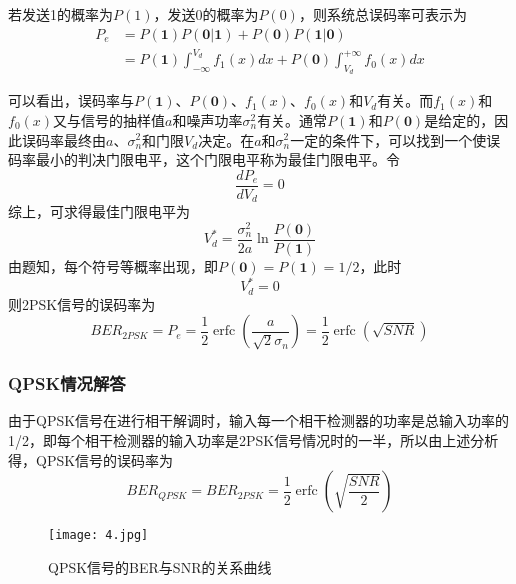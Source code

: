 \documentclass[bwprint]{gmcmthesis}
\numberwithin{equation}{section}
\begin{document}
若发送1的概率为$P(1)$，发送0的概率为$P(0)$，则系统总误码率可表示为
\begin{equation}
\begin{aligned}
P_{e}&=P(\mathbf{1}) P(\mathbf{0} | \mathbf{1})+P(\mathbf{0}) P(\mathbf{1} | \mathbf{0}) \\
& = P(\mathbf{1}) \int_{-\infty}^{V_{d}} f_{1}(x) d x+P(\mathbf{0}) \int_{V_{d}}^{+\infty} f_{0}(x) d x
\end{aligned}
\end{equation}

可以看出，误码率与$P(\mathbf{1})$、$P(\mathbf{0})$、$f_{1}(x)$、$f_{0}(x)$和$V_{d}$有关。而$f_{1}(x)$和$f_{0}(x)$又与信号的抽样值$a$和噪声功率$\sigma_{n}^{2}$有关。通常$P(\mathbf{1})$和$P(\mathbf{0})$是给定的，因此误码率最终由$a$、$\sigma_{n}^{2}$和门限$V_{d}$决定。在$a$和$\sigma_{n}^{2}$一定的条件下，可以找到一个使误码率最小的判决门限电平，这个门限电平称为最佳门限电平。令
\begin{equation}
\frac{d P_{e}}{d V_{d}}=0
\end{equation}
综上，可求得最佳门限电平为
\begin{equation}
V_{d}^{*}=\frac{\sigma_{n}^{2}}{2 a} \ln \frac{P(\mathbf{0})}{P(\mathbf{1})}
\end{equation}
由题知，每个符号等概率出现，即$P(\mathbf{0})=P(\mathbf{1})=1 / 2$，此时
\begin{equation}
V_{d}^{*}=0
\end{equation}
则2PSK信号的误码率为
\begin{equation}
B E R_{2 P S K}=P_{e}=\frac{1}{2} \operatorname{erfc}\left(\frac{a}{\sqrt{2} \sigma_{n}}\right)=\frac{1}{2} \operatorname{erfc}(\sqrt{S N R})
\end{equation}

\subsubsection*{QPSK情况解答}
由于QPSK信号在进行相干解调时，输入每一个相干检测器的功率是总输入功率的1/2，即每个相干检测器的输入功率是2PSK信号情况时的一半，所以由上述分析得，QPSK信号的误码率为
\begin{equation}
B E R_{Q P S K}=B E R_{2 P S K}=\frac{1}{2} \operatorname{erfc}\left(\sqrt{\frac{S N R}{2}}\right)
\end{equation}

\begin{figure}[htbp]
	\centering
	\texttt{[image: 4.jpg]}
	\caption{QPSK信号的BER与SNR的关系曲线}
\end{figure}
\end{document}
